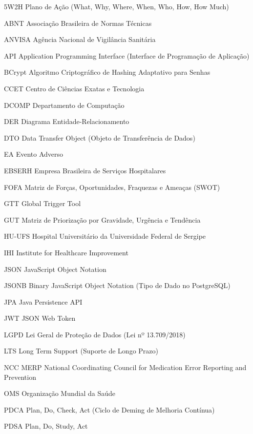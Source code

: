 \begin{siglas}
  \item[5W2H]{Plano de Ação (What, Why, Where, When, Who, How, How Much)}
  \item[ABNT]{Associação Brasileira de Normas Técnicas}
  \item[ANVISA]{Agência Nacional de Vigilância Sanitária}
  \item[API]{Application Programming Interface (Interface de Programação de Aplicação)}
  \item[BCrypt]{Algoritmo Criptográfico de Hashing Adaptativo para Senhas}
  \item[CCET]{Centro de Ciências Exatas e Tecnologia}
  \item[DCOMP]{Departamento de Computação}
  \item[DER]{Diagrama Entidade-Relacionamento}
  \item[DTO]{Data Transfer Object (Objeto de Transferência de Dados)}
  \item[EA]{Evento Adverso}
  \item[EBSERH]{Empresa Brasileira de Serviços Hospitalares}
  \item[FOFA]{Matriz de Forças, Oportunidades, Fraquezas e Ameaças (SWOT)}
  \item[GTT]{Global Trigger Tool}
  \item[GUT]{Matriz de Priorização por Gravidade, Urgência e Tendência}
  \item[HU-UFS]{Hospital Universitário da Universidade Federal de Sergipe}
  \item[IHI]{Institute for Healthcare Improvement}
  \item[JSON]{JavaScript Object Notation}
  \item[JSONB]{Binary JavaScript Object Notation (Tipo de Dado no PostgreSQL)}
  \item[JPA]{Java Persistence API}
  \item[JWT]{JSON Web Token}
  \item[LGPD]{Lei Geral de Proteção de Dados (Lei nº 13.709/2018)}
  \item[LTS]{Long Term Support (Suporte de Longo Prazo)}
  \item[NCC MERP]{National Coordinating Council for Medication Error Reporting and Prevention}
  \item[OMS]{Organização Mundial da Saúde}
  \item[PDCA]{Plan, Do, Check, Act (Ciclo de Deming de Melhoria Contínua)}
  \item[PDSA]{Plan, Do, Study, Act}

\end{siglas}
